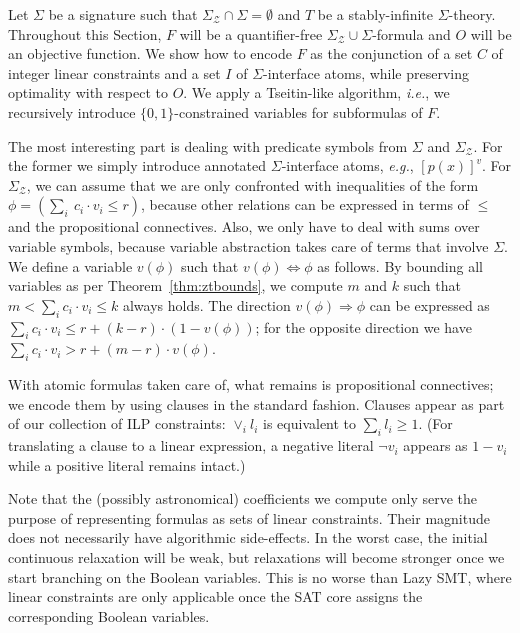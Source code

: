 \documentclass{llncs}
\newcommand{\comment}[1]{}
\newcommand{\ie}[0]{\emph{i.e.}, }
\newcommand{\eg}[0]{\emph{e.g.}, }
\newcommand{\SigmaZ}[0]{\ensuremath{\Sigma_{\mathcal{Z}}}}
\newcommand{\SigmaZT}[0]{\ensuremath{\SigmaZ{} \cup \Sigma}}
\newcommand{\bct}[0]{\ensuremath{\operatorname{BC}(T)}}
\begin{document}
Let $\Sigma$ be a signature such that $\SigmaZ{} \cap \Sigma =
\emptyset$ and $T$ be a stably-infinite $\Sigma$-theory. Throughout
this Section, $F$ will be a quantifier-free $\SigmaZT$-formula and $O$
will be an objective function. We show how to encode $F$ as the
conjunction of a set $C$ of integer linear constraints and a set $I$
of $\Sigma$-interface atoms, while preserving optimality with respect
to $O$. We apply a Tseitin-like algorithm, \ie we recursively
introduce $\{0, 1\}$-constrained variables for subformulas of $F$.

The most interesting part is dealing with predicate symbols from
$\Sigma$ and \SigmaZ{}. For the former we simply introduce annotated
$\Sigma$-interface atoms, \eg $[p(x)]^v$. For $\SigmaZ$, we can assume
that we are only confronted with inequalities of the form $\phi =
(\sum_i\ c_i \cdot v_i \leq r)$, because other relations can be
expressed in terms of $\leq$ and the propositional connectives. Also,
we only have to deal with sums over variable symbols, because variable
abstraction takes care of terms that involve $\Sigma$. We define a
variable $v(\phi)$ such that $v(\phi) \Leftrightarrow \phi$ as
follows. By bounding all variables as per Theorem~\ref{thm:ztbounds},
we compute $m$ and $k$ such that $m < \sum_i c_i \cdot v_i \leq k$
always holds.  The direction $v(\phi) \Rightarrow \phi$ can be
expressed as $\sum_i c_i \cdot v_i \leq r + (k - r) \cdot (1 -
v(\phi))$; for the opposite direction we have $\sum_i c_i \cdot v_i >
r + (m - r) \cdot v(\phi)$.

With atomic formulas taken care of, what remains is propositional
connectives; we encode them by using clauses in the standard
fashion. Clauses appear as part of our collection of ILP constraints:
$\vee_i l_i$ is equivalent to $\sum_i l_i \geq 1$. (For translating a
clause to a linear expression, a negative literal $\neg v_i$ appears
as $1 - v_i$ while a positive literal remains intact.)

Note that the (possibly astronomical) coefficients we compute only
serve the purpose of representing formulas as sets of linear
constraints. Their magnitude does not necessarily have algorithmic
side-effects. In the worst case, the initial continuous relaxation
will be weak, but relaxations will become stronger once we start
branching on the Boolean variables. This is no worse than Lazy SMT,
where linear constraints are only applicable once the SAT core assigns
the corresponding Boolean variables.

\comment{Modern ILP solvers provide an alternative called
  \emph{indicator constraints}~\footnote{\url{http://j.mp/NdkZZl}
    (CPLEX); \url{http://j.mp/NdlmDs} (SCIP)}, \ie natively supported
  constraints of the form $v = 1 \Rightarrow \sum_i\ c_i \cdot v_i
  \leq r$, where $v$ is a $\{0, 1\}$ variable. \bct{} does not
  explicitly provide indicator constraints, in order to stay within
  the standard formulation of ILP. }
\end{document}
